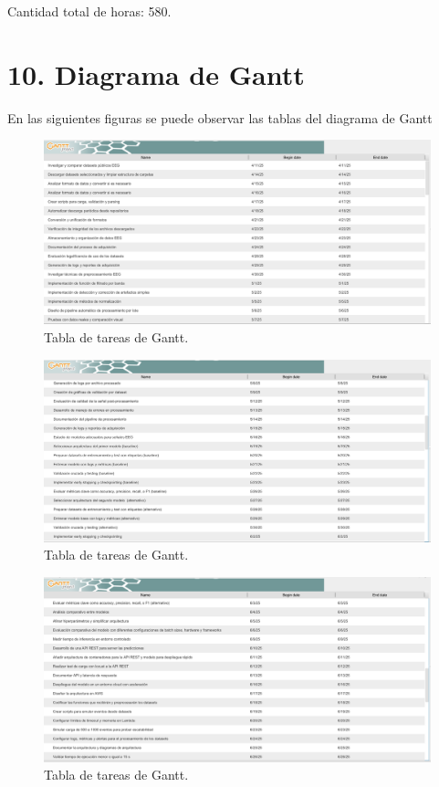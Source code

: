 \documentclass[
11pt, %
]{charter}
\begin{document}
Cantidad total de horas: 580.
\section{10. Diagrama de Gantt}
\label{sec:gantt}


En las siguientes figuras se puede observar las tablas del diagrama de Gantt
\begin{figure}[htpb]
\centering 
\includegraphics[width=.99\textwidth]{./Figuras/tareas-1.png}
\caption{Tabla de tareas de Gantt.}
\label{fig:diagBloques}
\end{figure}


\begin{figure}[htpb]
\centering 
\includegraphics[width=.99\textwidth]{./Figuras/tareas-2.png}
\caption{Tabla de tareas de Gantt.}
\label{fig:diagBloques}
\end{figure}

\begin{figure}[htpb]
\centering 
\includegraphics[width=.99\textwidth]{./Figuras/tareas-3.png}
\caption{Tabla de tareas de Gantt.}
\label{fig:diagBloques}
\end{figure}
\end{document}
